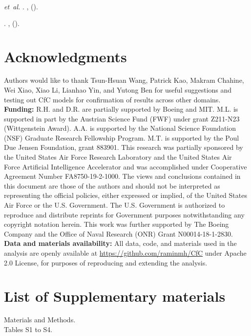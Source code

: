 \documentclass[12pt]{article}
\begin{document}
\begin{thebibliography}{10}
 \emph{et~al.}
\newblock {}.
\newblock \emph{}
  \textbf{}, 
  ().

\newblock \emph{}.
\newblock {},  ().

\end{thebibliography}


\section*{Acknowledgments}
Authors would like to thank Tsun-Hsuan Wang, Patrick Kao, Makram Chahine, Wei Xiao, Xiao Li, Lianhao Yin, and Yutong Ben for useful suggestions and testing out CfC models for confirmation of results across other domains. \noindent \textbf{Funding:} R.H. and D.R. are partially supported by Boeing and MIT. M.L. is supported in part by the Austrian Science Fund (FWF) under grant Z211-N23 (Wittgenstein Award). A.A. is supported by the National Science Foundation (NSF) Graduate Research Fellowship Program. M.T. is supported by the Poul Due Jensen Foundation, grant 883901. This research was partially sponsored by the United States Air Force Research Laboratory and the United States Air Force Artificial Intelligence Accelerator and was accomplished under Cooperative Agreement Number FA8750-19-2-1000. The views and conclusions contained in this document are those of the authors and should not be interpreted as representing the official policies, either expressed or implied, of the United States Air Force or the U.S. Government. The U.S. Government is authorized to reproduce and distribute reprints for Government purposes notwithstanding any copyright notation herein. This work was further supported by The Boeing Company and the Office of Naval Research (ONR) Grant N00014-18-1-2830. \textbf{Data and materials availability:} All data, code, and materials used in the analysis are openly available at \url{https://github.com/raminmh/CfC} under Apache 2.0 License, for purposes of reproducing and extending the analysis.

\section*{List of Supplementary materials}
\noindent Materials and Methods. \\
\noindent Tables S1 to S4.
\end{document}
